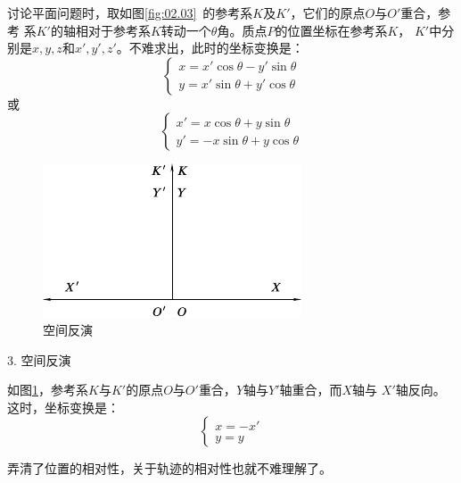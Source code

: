 讨论平面问题时，取如图\ref{fig:02.03}~的参考系$K$及$K'$，它们的原点$O$与$O'$重合，参考
系$K'$的轴相对于参考系$ K $转动一个$\theta$角。质点$P$的位置坐标在参考系$K$，
$K'$中分别是$x,y,z$和$x',y',z'$。不难求出，此时的坐标变换是：
\begin{equation}\label{eqn:02.02.04}
  \left\{\begin{array}{l}
    x=x'\cos\theta-y'\sin\theta \\
    y=x'\sin\theta+y'\cos\theta
  \end{array}\right.
\end{equation}
或
\begin{equation*}
  \left\{\begin{array}{l}
    x'=x\cos\theta+y\sin\theta \\
    y'=-x\sin\theta+y\cos\theta
  \end{array}\right.
\end{equation*}

\begin{figure}
  \centering
  \includegraphics{figure/fig02.04}
  \caption{空间反演}
  \label{fig:02.04}
\end{figure}
\textsf{3. 空间反演}

如图\ref{fig:02.04}，参考系$K$与$K'$的原点$O$与$O'$重合，$Y$轴与$Y'$轴重合，而$X$轴与
$X'$轴反向。这时，坐标变换是：
{\setlength{\mathindent}{2em}
\begin{equation}\label{eqn:02.02.05}
  \left\{\begin{array}{l}
    x=-x' \\
    y=y
  \end{array}\right.
\end{equation}}%

弄清了位置的相对性，关于轨迹的相对性也就不难理解了。

